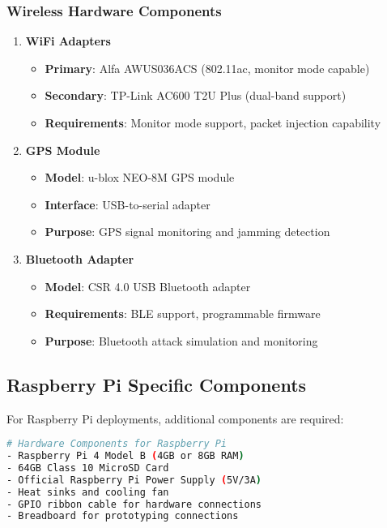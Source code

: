 \documentclass[12pt,a4paper]{report}
\begin{document}
\subsubsection{Wireless Hardware Components}

\begin{enumerate}
    \item \textbf{WiFi Adapters}
    \begin{itemize}
        \item \textbf{Primary}: Alfa AWUS036ACS (802.11ac, monitor mode capable)
        \item \textbf{Secondary}: TP-Link AC600 T2U Plus (dual-band support)
        \item \textbf{Requirements}: Monitor mode support, packet injection capability
    \end{itemize}
    
    \item \textbf{GPS Module}
    \begin{itemize}
        \item \textbf{Model}: u-blox NEO-8M GPS module
        \item \textbf{Interface}: USB-to-serial adapter
        \item \textbf{Purpose}: GPS signal monitoring and jamming detection
    \end{itemize}
    
    \item \textbf{Bluetooth Adapter}
    \begin{itemize}
        \item \textbf{Model}: CSR 4.0 USB Bluetooth adapter
        \item \textbf{Requirements}: BLE support, programmable firmware
        \item \textbf{Purpose}: Bluetooth attack simulation and monitoring
    \end{itemize}
\end{enumerate}

\subsection{Raspberry Pi Specific Components}

For Raspberry Pi deployments, additional components are required:

\begin{lstlisting}[language=bash, caption=Raspberry Pi Hardware Setup]
# Hardware Components for Raspberry Pi
- Raspberry Pi 4 Model B (4GB or 8GB RAM)
- 64GB Class 10 MicroSD Card
- Official Raspberry Pi Power Supply (5V/3A)
- Heat sinks and cooling fan
- GPIO ribbon cable for hardware connections
- Breadboard for prototyping connections
\end{lstlisting}
\end{document}
